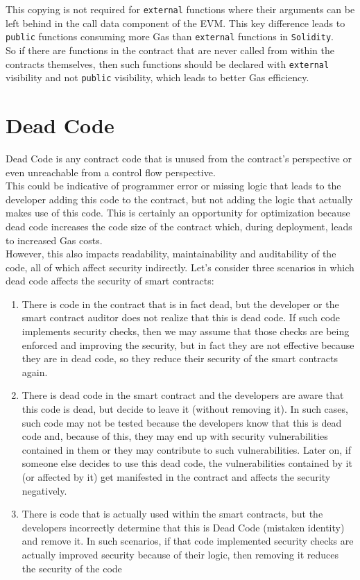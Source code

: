 This copying is not required for \texttt{external} functions where their arguments can be left behind in the call data component of the EVM. This key difference leads to \texttt{public} functions consuming more Gas than \texttt{external} functions in \texttt{Solidity}. \\

So if there are functions in the contract that are never called from within the contracts themselves, then such functions should be declared with \texttt{external} visibility and not \texttt{public} visibility, which leads to better Gas efficiency.

\section{Dead Code}
Dead Code is any contract code that is unused from the contract's perspective or even unreachable from a control flow perspective. \\

This could be indicative of programmer error or missing logic that leads to the developer adding this code to the contract, but not adding the logic that actually makes use of this code. This is certainly an opportunity for optimization because dead code increases the code size of the contract which, during deployment, leads to increased Gas costs.\\

However, this also impacts readability, maintainability and auditability of the code, all of which affect security indirectly. Let's consider three scenarios in which dead code affects the security of smart contracts:

\begin{enumerate}

\item There is code in the contract that is in fact dead, but the developer or the smart contract auditor does not realize that this is dead code. If such code implements security checks, then we may assume that those checks are being enforced and improving the security, but in fact they are not effective because they are in dead code, so they reduce their security of the smart contracts again.
\item There is dead code in the smart contract and the developers are aware that this code is dead, but decide to leave it (without removing it). In such cases, such code may not be tested because the developers know that this is dead code and, because of this, they may end up with security vulnerabilities contained in them or they may contribute to such vulnerabilities. Later on, if someone else decides to use this dead code, the vulnerabilities contained by it (or affected by it) get manifested in the contract and affects the security negatively.
\item There is code that is actually used within the smart contracts, but the developers incorrectly determine that this is Dead Code (mistaken identity) and remove it. In such scenarios, if that code implemented security checks are actually improved security because of their logic, then removing it reduces the security of the code
\end{enumerate}

